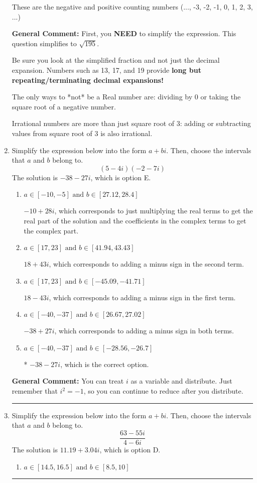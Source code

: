 \documentclass{extbook}[14pt]
\newcommand{\litem}[1]{\item #1

\rule{\textwidth}{0.4pt}}
\begin{document}
\begin{enumerate}
{\begin{enumerate}[label=\Alph*.]
These are the negative and positive counting numbers (..., -3, -2, -1, 0, 1, 2, 3, ...)
\end{enumerate}

\textbf{General Comment:} First, you \textbf{NEED} to simplify the expression. This question simplifies to $\sqrt{195}$. 
 
 Be sure you look at the simplified fraction and not just the decimal expansion. Numbers such as 13, 17, and 19 provide \textbf{long but repeating/terminating decimal expansions!} 
 
 The only ways to *not* be a Real number are: dividing by 0 or taking the square root of a negative number. 
 
 Irrational numbers are more than just square root of 3: adding or subtracting values from square root of 3 is also irrational.
}
\litem{
Simplify the expression below into the form $a+bi$. Then, choose the intervals that $a$ and $b$ belong to.
\[ (5 - 4 i)(-2 - 7 i) \]The solution is \( -38 - 27 i \), which is option E.\begin{enumerate}[label=\Alph*.]
\item \( a \in [-10, -5] \text{ and } b \in [27.12, 28.4] \)

 $-10 + 28 i$, which corresponds to just multiplying the real terms to get the real part of the solution and the coefficients in the complex terms to get the complex part.
\item \( a \in [17, 23] \text{ and } b \in [41.94, 43.43] \)

 $18 + 43 i$, which corresponds to adding a minus sign in the second term.
\item \( a \in [17, 23] \text{ and } b \in [-45.09, -41.71] \)

 $18 - 43 i$, which corresponds to adding a minus sign in the first term.
\item \( a \in [-40, -37] \text{ and } b \in [26.67, 27.02] \)

 $-38 + 27 i$, which corresponds to adding a minus sign in both terms.
\item \( a \in [-40, -37] \text{ and } b \in [-28.56, -26.7] \)

* $-38 - 27 i$, which is the correct option.
\end{enumerate}

\textbf{General Comment:} You can treat $i$ as a variable and distribute. Just remember that $i^2=-1$, so you can continue to reduce after you distribute.
}
\litem{
Simplify the expression below into the form $a+bi$. Then, choose the intervals that $a$ and $b$ belong to.
\[ \frac{63 - 55 i}{4 - 6 i} \]The solution is \( 11.19  + 3.04 i \), which is option D.\begin{enumerate}[label=\Alph*.]
\item \( a \in [14.5, 16.5] \text{ and } b \in [8.5, 10] \)


\end{enumerate}}
\end{enumerate}
\end{document}
